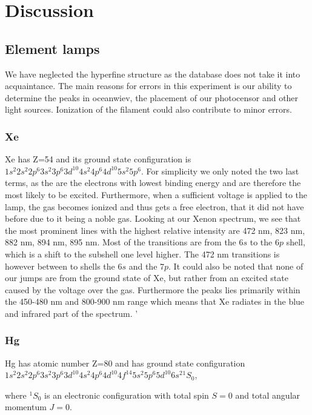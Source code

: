 \section{Discussion}

\subsection{Element lamps}

We have neglected the hyperfine structure as the database does not take it into acquaintance. The main reasons for errors in this experiment is our ability to determine the peaks in oceanwiev, the placement of our photocensor and other light sources. Ionization of the filament could also contribute to minor errors. 

\subsubsection{Xe}

Xe has Z=54 and its ground state configuration is $1s^2 2s^2 2p^6 3s^2 3p^6 3d^10 4s^2 4p^6 4d^10 5s^2 5p^6$. For simplicity we only noted the two last terms, as the are the electrons with lowest binding energy and are therefore the most likely to be excited. Furthermore, when a sufficient voltage is applied to the lamp, the gas becomes ionized and thus gets a free electron, that it did not have before due to it being a noble gas. Looking at our Xenon spectrum, we see that the most prominent lines with the highest relative intensity are 472 nm, 823 nm, 882 nm, 894 nm, 895 nm. Most of the transitions are from the $6s$ to the $6p$ shell, which is a shift to the subshell one level higher. The 472 nm transitions is however between to shells the $6s$ and the $7p$. It could also be noted that none of our jumps are from the ground state of Xe, but rather from an excited state caused by the voltage over the gas. Furthermore the peaks lies primarily within the 450-480 nm and 800-900 nm range which means that Xe radiates in the blue and infrared part of the spectrum. '

\subsubsection{Hg}

Hg has atomic number Z=80 and has ground state configuration $1s^2 2s^2 2p^6 3s^2 3p^6 3d^10 4s^2 4p^6 4d^10 4f^{14}5s^2 5p^6 5d^10 6s^2 {}^1S_0$,

where ${}^1S_{0}$ is an electronic configuration with total spin $S=0$ and total angular momentum $J=0$.\\

